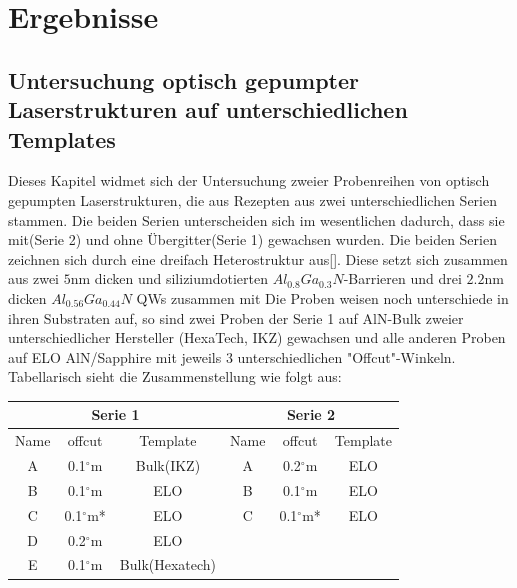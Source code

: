 \chapter{Ergebnisse}
\thispagestyle{fancy}
\section{Untersuchung optisch gepumpter Laserstrukturen auf unterschiedlichen Templates}




Dieses Kapitel widmet sich der Untersuchung zweier Probenreihen von optisch gepumpten Laserstrukturen, die aus Rezepten aus zwei unterschiedlichen Serien stammen. Die beiden Serien unterscheiden sich im wesentlichen dadurch, dass sie mit(Serie 2) und ohne Übergitter(Serie 1) gewachsen wurden.  Die beiden Serien zeichnen sich durch eine dreifach Heterostruktur aus[]. Diese setzt sich zusammen aus zwei $5$nm dicken und siliziumdotierten $ Al_{0.8}Ga_{0.3}N$-Barrieren und drei $2.2$nm dicken $ Al_{0.56}Ga_{0.44}N$ QWs zusammen mit 
Die Proben weisen noch unterschiede in ihren Substraten auf, so sind zwei Proben der Serie 1 auf AlN-Bulk zweier unterschiedlicher Hersteller (HexaTech, IKZ) gewachsen und alle anderen Proben auf ELO AlN/Sapphire mit jeweils 3 unterschiedlichen "Offcut"-Winkeln. Tabellarisch sieht die Zusammenstellung wie folgt aus: 

\vspace{1cm}


\setlength{\arrayrulewidth}{0.05mm}
\setlength{\tabcolsep}{2.5mm}
\renewcommand{\arraystretch}{1}
 
\centering
\begin{tabular}{ |c|c|c|c|c|c|   }
\hline
\multicolumn{3}{|c|}{Serie 1} & \multicolumn{3}{c|}{Serie 2}  \\
\hline
Name & offcut& Template & Name& offcut & Template \\
\hline
A & 0.1$^\circ$m & Bulk(IKZ) &A & 0.2$^\circ$m & ELO \\
B & 0.1$^\circ$m & ELO & B & 0.1$^\circ$m & ELO \\
C & 0.1$^\circ$m* & ELO & C & 0.1$^\circ$m* & ELO \\
D & 0.2$^\circ$m & ELO &  & &  \\
E & 0.1$^\circ$m & Bulk(Hexatech) & & & \\
\hline
\end{tabular}
\newpage







